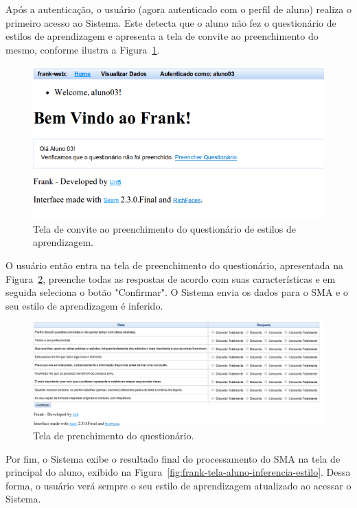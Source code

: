 Após a autenticação, o usuário (agora autenticado com o perfil de aluno) realiza o primeiro acesso ao Sistema. Este detecta que o aluno não fez o questionário de estilos de aprendizagem e apresenta a tela de convite ao preenchimento do mesmo, conforme ilustra a Figura~\ref{fig:frank-tela-aluno-prim-acesso}.

\begin{figure}
	\centering
	\includegraphics[scale=0.6]{images/frank-tela-aluno-prim-acesso.png}
	\caption{Tela de convite ao preenchimento do questionário de estilos de aprendizagem.}
	\label{fig:frank-tela-aluno-prim-acesso}
\end{figure}

O usuário então entra na tela de preenchimento do questionário, apresentada na Figura~\ref{fig:frank-tela-aluno-preencher-questionario}, preenche todas as respostas de acordo com suas características e em seguida seleciona o botão "Confirmar". O Sistema envia os dados para o SMA e o seu estilo de aprendizagem é inferido.

\begin{figure}
	\centering
	\includegraphics[scale=0.4]{images/frank-tela-aluno-preencher-questionario.png}
	\caption{Tela de prenchimento do questionário.}
	\label{fig:frank-tela-aluno-preencher-questionario}
\end{figure}

Por fim, o Sistema exibe o resultado final do processamento do SMA na tela de principal do aluno, exibido na Figura~\ref{fig:frank-tela-aluno-inferencia-estilo}. Dessa forma, o usuário verá sempre o seu estilo de aprendizagem atualizado ao acessar o Sistema.

